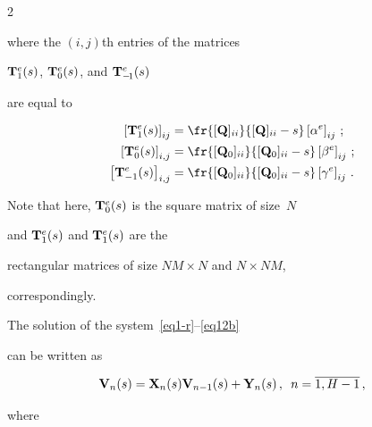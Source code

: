 \begin{multicols}{2}
\noindent 


where the $(i,j)${th} entries of the matrices 


$\mathbf{T}^e_{1}(s)$, $\mathbf{T}^e_0(s)$, and $\mathbf{T}^e_{-\!1}(s)$


are equal to 


\begin{align*}


\left[ \bmx{T}^e_1(s) \right]_{ij}


&=


\fr{[\bmx{Q}]_{ii} }{[\bmx{Q}]_{ii} - s}


\left[\alpha^{e}\right]_{ij}\,;


\\


\left[ \bmx{T}^e_0(s) \right]_{i,j}


&=


\fr{[\bmx{Q}_0]_{ii}}{[\bmx{Q}_0]_{ii} - s}


\left[\beta^{e}\right]_{ij}


\,;


\\


\left[ \bmx{T}^e_{-1}(s) \right]_{i,j}


&=


\fr{[\bmx{Q}_0]_{ii}}{[\bmx{Q}_0]_{ii} - s}


\left[\gamma^{e}\right]_{ij}\,.


\end{align*}





\noindent 


Note that here, $\mathbf{T}^e_0(s)$ is the square matrix of size~$N$


and $\mathbf{T}^e_1(s) $ and $\mathbf{T}^e_1(s)$ are the


rectangular matrices of size $NM\times N$ and $N\times NM$,


correspondingly.


The solution of the system~\eqref{eq1-r}--\eqref{eq12b}


can be written as 


$$


\bmx{V}_{n}(s)=\bmx{X}_{n}(s) \bmx{V}_{n-1}(s)+\bmx{Y}_{n}(s)\,,


\enskip n=\overline{1,H-1}\,,


$$





\noindent where 



\end{multicols}
